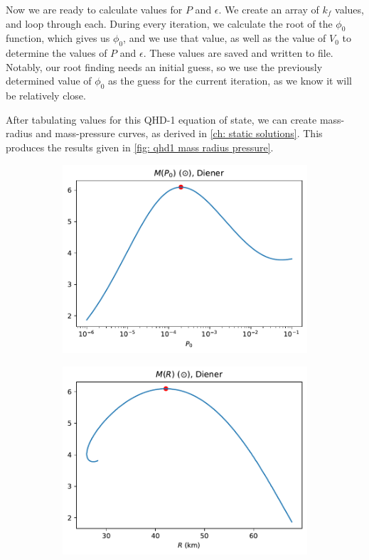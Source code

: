Now we are ready to calculate values for $P$ and $\epsilon$. We create an array of $k_f$ values, and loop through each. During every iteration, we calculate the root of the $\phi_0$ function, which gives us $\phi_0$, and we use that value, as well as the value of $V_0$ to determine the values of $P$ and $\epsilon$.  These values are saved and written to file. Notably, our root finding needs an initial guess, so we use the previously determined value of $\phi_0$ as the guess for the current iteration, as we know it will be relatively close.

After tabulating values for this QHD-1 equation of state, we can create mass-radius and mass-pressure curves, as derived in \autoref{ch: static solutions}. This produces the results given in \autoref{fig: qhd1 mass radius pressure}.

\begin{figure}[h!]
    \centering
    \begin{subfigure}{.5\textwidth}
        \includegraphics[width=\textwidth]{images/qhd1/p0_analysis.pdf}
    \end{subfigure}%
    \begin{subfigure}{.5\textwidth}
        \includegraphics[width=\textwidth]{images/qhd1/r_analysis.pdf}

\end{subfigure}
\end{figure}

